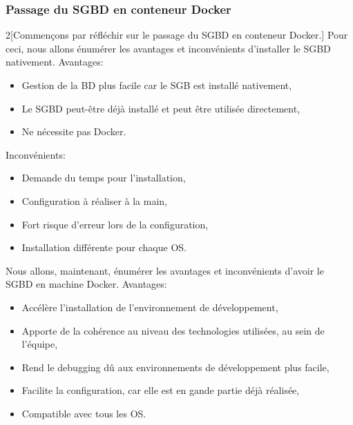 \documentclass[
    iai, %
    il, %
]{heig-tb}
\begin{document}
\subsubsection{Passage du SGBD en conteneur Docker}
\begin{multicols}{2}[Commençons par réfléchir sur le passage du SGBD en conteneur Docker.]
    Pour ceci, nous allons énumérer les avantages et inconvénients d'installer le SGBD nativement.
    Avantages:
    \begin{itemize}
        \item Gestion de la BD plus facile car le SGB est installé nativement,
        \item Le SGBD peut-être déjà installé et peut être utilisée directement,
        \item Ne nécessite pas Docker.
    \end{itemize}

    Inconvénients:
    \begin{itemize}
        \item Demande du temps pour l'installation,
        \item Configuration à réaliser à la main,
        \item Fort risque d'erreur lors de la configuration,
        \item Installation différente pour chaque OS.
    \end{itemize}

    \columnbreak
    Nous allons, maintenant, énumérer les avantages et inconvénients d'avoir le SGBD en machine Docker.
    Avantages:
    \begin{itemize}
        \item Accélère l'installation de l'environnement de développement, \cite{labrecque,data-flair-pros-cons}
        \item Apporte de la cohérence au niveau des technologies utilisées, au sein de l'équipe, \cite{labrecque, data-flair-use-cases}
        \item Rend le debugging dû aux environnements de développement plus facile, \cite{labrecque,koukia}
        \item Facilite la configuration, car elle est en gande partie déjà réalisée, \cite{data-flair-pros-cons}
        \item Compatible avec tous les OS.
    \end{itemize}


\end{multicols}
\end{document}
